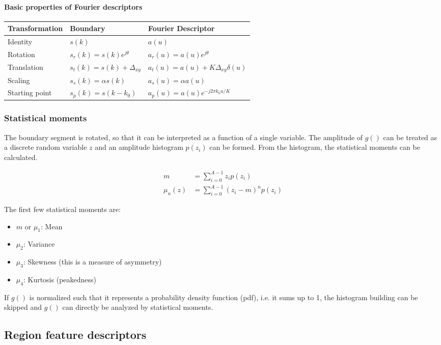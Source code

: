 \paragraph{Basic properties of Fourier descriptors}
\begin{tabularx}{\textwidth}{XXX}
Transformation & Boundary & Fourier Descriptor \\\hline
Identity & $s(k)$ & $a(u)$ \\
Rotation & $s_r(k)=s(k)e^{j\theta}$& $a_r(u)=a(u)e^{j\theta}$ \\
Translation &$s_t(k)=s(k)+\Delta_{xy}$& $a_t(u)=a(u)+K\Delta_{xy}\delta(u)$ \\
Scaling &$s_s(k)=\alpha s(k)$& $a_s(u)=\alpha a(u)$ \\
Starting point & $s_p(k)=s(k-k_0)$& $a_p(u)=a(u)e^{-j2\pi k_0u/K}$ \\ \hline
\end{tabularx}

\subsubsection{Statistical moments}
The boundary segment is rotated, so that it can be interpreted as a function of a single variable.
The amplitude of $g()$ can be treated as a discrete random variable $z$ and an amplitude histogram $p(z_i)$ can be formed.
From the histogram, the statistical moments can be calculated.

\begin{align*}
	m &= \sum\limits_{i=0}^{A-1} z_i p(z_i) \\
	\mu_n(z) &= \sum\limits_{i=0}^{A-1} (z_i-m)^n p(z_i)
\end{align*}

The first few statistical moments are:
\begin{itemize}
\item $m$ or $\mu_1$: Mean
\item $\mu_2$: Variance
\item $\mu_3$: Skewness (this is a measure of asymmetry)
\item $\mu_4$: Kurtosis (peakedness)
\end{itemize}

If $g()$ is normalized such that it represents a probability density function (pdf), i.e. it sums up to 1,
the histogram building can be skipped and $g()$ can directly be analyzed by statistical moments.

\subsection{Region feature descriptors}
